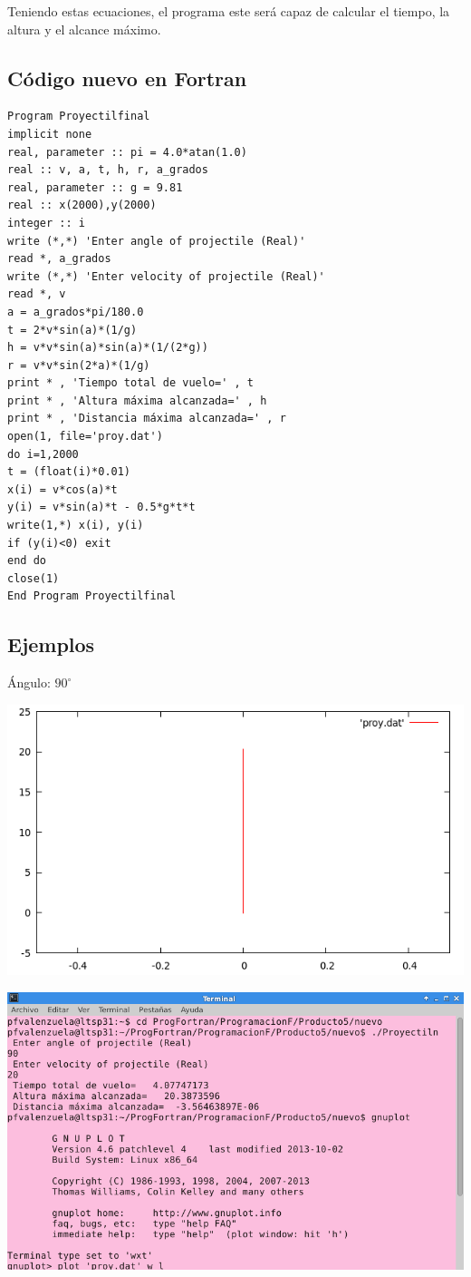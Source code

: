 \documentclass[12pt]{article}
\begin{document}
Teniendo estas ecuaciones, el programa este será capaz de calcular el tiempo, la altura y el alcance máximo.

\subsection{Código nuevo en Fortran}

\begin{verbatim}
Program Proyectilfinal
implicit none
real, parameter :: pi = 4.0*atan(1.0)
real :: v, a, t, h, r, a_grados
real, parameter :: g = 9.81
real :: x(2000),y(2000)
integer :: i
write (*,*) 'Enter angle of projectile (Real)'
read *, a_grados
write (*,*) 'Enter velocity of projectile (Real)'
read *, v
a = a_grados*pi/180.0
t = 2*v*sin(a)*(1/g)
h = v*v*sin(a)*sin(a)*(1/(2*g))
r = v*v*sin(2*a)*(1/g)
print * , 'Tiempo total de vuelo=' , t
print * , 'Altura máxima alcanzada=' , h
print * , 'Distancia máxima alcanzada=' , r
open(1, file='proy.dat')
do i=1,2000
t = (float(i)*0.01)
x(i) = v*cos(a)*t
y(i) = v*sin(a)*t - 0.5*g*t*t
write(1,*) x(i), y(i)
if (y(i)<0) exit
end do
close(1)
End Program Proyectilfinal
\end{verbatim}
\pagebreak
\subsection{Ejemplos}
Ángulo: $90^{\circ}$
\begin{center}
\includegraphics[scale=0.6]{Grafica90.png}
\end{center}

\begin{center}
\includegraphics[scale=0.6]{Resultados90.png}
\end{center}
\end{document}
